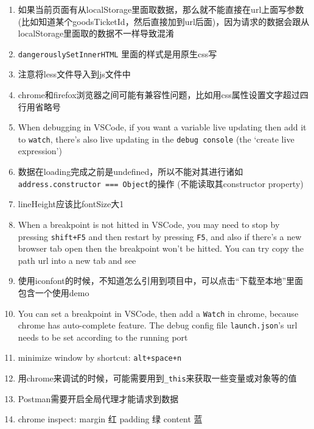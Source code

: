 \documentclass[a4paper, 12pt]{article}
\begin{document}
\begin{enumerate}
\item 如果当前页面有从localStorage里面取数据，那么就不能直接在url上面写参数 (比如知道某个goodsTicketId，然后直接加到url后面)，因为请求的数据会跟从localStorage里面取的数据不一样导致混淆

\item \verb|dangerouslySetInnerHTML| 里面的样式是用原生css写

\item 注意将less文件导入到js文件中

\item chrome和firefox浏览器之间可能有兼容性问题，比如用css属性设置文字超过四行用省略号

\item When debugging in VSCode, if you want a variable live updating then add it to \verb|watch|, there's also live updating in the \verb|debug console| (the `create live expression')

\item 数据在loading完成之前是undefined，所以不能对其进行诸如\\ \verb|address.constructor === Object|的操作 (不能读取其constructor property)

\item lineHeight应该比fontSize大1

\item When a breakpoint is not hitted in VSCode, you may need to stop by pressing \verb|shift+F5| and then restart by pressing \verb|F5|, and also if there's a new browser tab open then the breakpoint won't be hitted. You can try copy the path url into a new tab and see

\item 使用iconfont的时候，不知道怎么引用到项目中，可以点击“下载至本地”里面包含一个使用demo

\item You can set a breakpoint in VSCode, then add a \verb|Watch| in chrome, because chrome has auto-complete feature. The debug config file \verb|launch.json|'s url needs to be set according to the running port

\item minimize window by shortcut: \verb|alt+space+n|

\item 用chrome来调试的时候，可能需要用到\verb|_this|来获取一些变量或对象等的值

\item Postman需要开启全局代理才能请求到数据

\item chrome inspect: margin 红 \quad padding 绿 \quad content 蓝


\end{enumerate}
\end{document}
